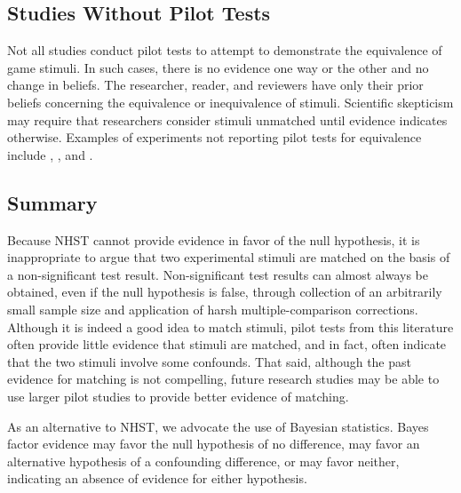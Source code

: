 \documentclass[man]{apa6}
\begin{document}
\subsection{Studies Without Pilot Tests}
Not all studies conduct pilot tests to attempt to demonstrate the equivalence of game stimuli. In such cases, there is no evidence one way or the other and no change in beliefs. The researcher, reader, and reviewers have only their prior beliefs concerning the equivalence or inequivalence of stimuli. Scientific skepticism may require that researchers consider stimuli unmatched until evidence indicates otherwise. Examples of experiments not reporting pilot tests for equivalence include \citet{Bartholow:Anderson:2002}, \citet{Bartholow:etal:2005}, and \citet{Hasan:etal:2012}. 

\subsection{Summary}
Because NHST cannot provide evidence in favor of the null hypothesis, it is inappropriate to argue that two experimental stimuli are matched on the basis of a non-significant test result.  Non-significant test results can almost always be obtained, even if the null hypothesis is false, through collection of an arbitrarily small sample size and application of harsh multiple-comparison corrections.  Although it is indeed a good idea to match stimuli, pilot tests from this literature often provide little evidence that stimuli are matched, and in fact, often indicate that the two stimuli involve some confounds. That said, although the past evidence for matching is not compelling, future research studies may be able to use larger pilot studies to provide better evidence of matching. 

As an alternative to NHST, we advocate the use of Bayesian statistics. Bayes factor evidence may favor the null hypothesis of no difference, may favor an alternative hypothesis of a confounding difference, or may favor neither, indicating an absence of evidence for either hypothesis. 
\end{document}
